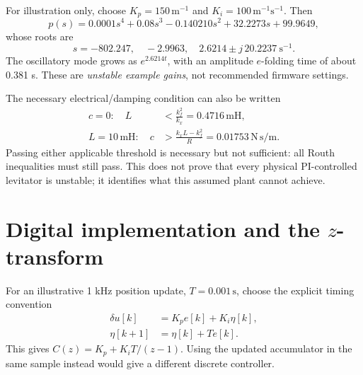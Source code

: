 \documentclass[11pt,letterpaper]{article}
\begin{document}
For illustration only, choose \(K_p=150\,\mathrm{m^{-1}}\) and
\(K_i=100\,\mathrm{m^{-1}s^{-1}}\). Then
\begin{equation}
 p(s)=0.0001s^4+0.08s^3-0.140210s^2+32.2273s+99.9649,
\end{equation}
whose roots are
\begin{equation}
 \boxed{s=-802.247,\quad -2.9963,\quad 2.6214\pm j\,20.2237\ \mathrm{s^{-1}}.}
\end{equation}
The oscillatory mode grows as \(e^{2.6214t}\), with an amplitude
\(e\)-folding time of about 0.381 s. These are \emph{unstable example gains},
not recommended firmware settings.

The necessary electrical/damping condition can also be written
\begin{align}
 c=0:\quad L&<\frac{k_f^2}{k_x}=0.4716\,\mathrm{mH},\\
 L=10\,\mathrm{mH}:\quad c&>\frac{k_xL-k_f^2}{R}
 =0.01753\,\mathrm{N\,s/m}.
\end{align}
Passing either applicable threshold is necessary but not sufficient: all
Routh inequalities must still pass. This does not prove that every physical
PI-controlled levitator is unstable; it identifies what this assumed plant
cannot achieve.

\section{Digital implementation and the \texorpdfstring{\(z\)}{z}-transform}
For an illustrative 1 kHz position update, \(T=0.001\,\mathrm s\), choose
the explicit timing convention
\begin{align}
 \delta u[k]&=K_pe[k]+K_i\eta[k],\\
 \eta[k+1]&=\eta[k]+Te[k].
\end{align}
This gives \(C(z)=K_p+K_iT/(z-1)\). Using the updated accumulator in the
same sample instead would give a different discrete controller.
\end{document}
